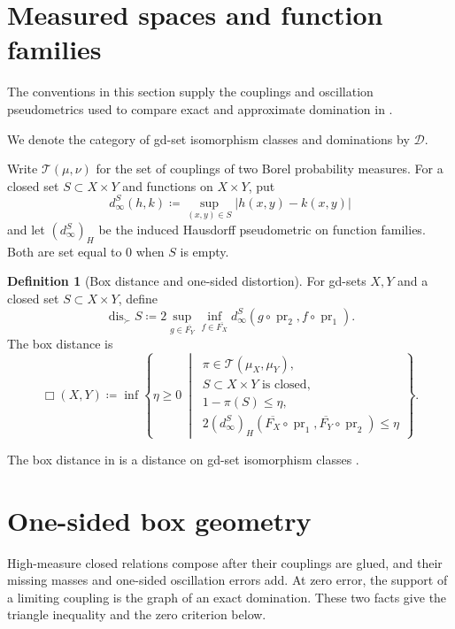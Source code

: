 \documentclass{amsart}
\theoremstyle{plain}
\theoremstyle{definition}
\newtheorem{definition}[theorem]{Definition}
\theoremstyle{remark}
\newcommand{\D}{\mathcal{D}}
\DeclareMathOperator{\dis}{dis}
\DeclareMathOperator{\pr}{pr}
\newcommand{\dinf}[1]{d^{#1}_{\infty}}
\newcommand{\haus}[1]{\left(#1\right)_H}
\newcommand{\Tplan}{\mathcal{T}}
\begin{document}
\section{Measured spaces and function families}
\label{sec:background}

The conventions in this section supply the couplings and oscillation
pseudometrics used to compare exact and approximate domination in
.

We denote the category of gd-set isomorphism classes and dominations by
$\D$.

Write $\Tplan(\mu,\nu)$ for the set of couplings of two Borel probability
measures.  For a closed set $S\subset X\times Y$ and functions on
$X\times Y$, put
\[
\dinf{S}(h,k)\coloneqq\sup_{(x,y)\in S}|h(x,y)-k(x,y)|
\]
and let $\haus{\dinf{S}}$ be the induced Hausdorff pseudometric on function
families.  Both are set equal to $0$ when $S$ is empty.

\begin{definition}[Box distance and one-sided distortion]
\label{def:gds-distances}
For gd-sets $X,Y$ and a closed set $S\subset X\times Y$, define
\begin{equation}
\label{eq:gds-directed-distortion}
\dis_{\succ}S\coloneqq
2\sup_{g\in\overline{F_Y}}\inf_{f\in\overline{F_X}}
\dinf{S}(g\circ\pr_2,f\circ\pr_1).
\end{equation}
The box distance is
\begin{equation}
\label{eq:gds-box}
\Box(X,Y)\coloneqq
\inf\left\{\eta\geq0\ \middle|\
\begin{array}{l}
\pi\in\Tplan(\mu_X,\mu_Y),\\
S\subset X\times Y\text{ is closed},\\
1-\pi(S)\leq\eta,\\
2\haus{\dinf{S}}(\overline{F_X}\circ\pr_1, \overline{F_Y}\circ\pr_2)\leq\eta
\end{array}\right\}.
\end{equation}
\end{definition}

The box distance in  is a distance on gd-set isomorphism
classes \cite[Definition~5.7 and Proposition~5.13]{gds1}.

\section{One-sided box geometry}
\label{sec:one-sided-box}

High-measure closed relations compose after their couplings are glued, and
their missing masses and one-sided oscillation errors add.  At zero error,
the support of a limiting coupling is the graph of an exact domination.
These two facts give the triangle inequality and the zero criterion below.
\end{document}
